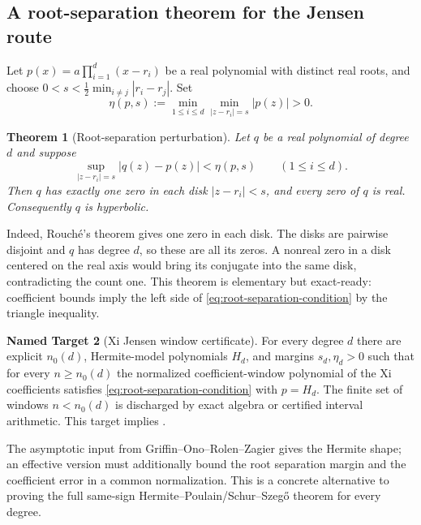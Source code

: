 \documentclass[11pt,a4paper]{article}
\newtheorem{theorem}{Theorem}[section]
\theoremstyle{definition}
\newtheorem{target}[theorem]{Named Target}
\newcommand{\Lean}[1]{\texttt{\small\seqsplit{#1}}}
\begin{document}
\subsection{A root-separation theorem for the Jensen route}

Let $p(x)=a\prod_{i=1}^d(x-r_i)$ be a real polynomial with distinct real
roots, and choose $0<s<\tfrac12\min_{i\ne j}|r_i-r_j|$.  Set
\begin{equation}
  \eta(p,s):=\min_{1\le i\le d}\min_{|z-r_i|=s}|p(z)|>0.
  \label{eq:rouche-margin}
\end{equation}

\begin{theorem}[Root-separation perturbation]
Let $q$ be a real polynomial of degree $d$ and suppose
\begin{equation}
  \sup_{|z-r_i|=s}|q(z)-p(z)|<\eta(p,s)
  \qquad(1\le i\le d).
  \label{eq:root-separation-condition}
\end{equation}
Then $q$ has exactly one zero in each disk $|z-r_i|<s$, and every zero of
$q$ is real.  Consequently $q$ is hyperbolic.
\end{theorem}

Indeed, Rouch\'e's theorem gives one zero in each disk.  The disks are
pairwise disjoint and $q$ has degree $d$, so these are all its zeros.  A
nonreal zero in a disk centered on the real axis would bring its conjugate
into the same disk, contradicting the count one.  This theorem is elementary
but exact-ready: coefficient bounds imply the left side of
\eqref{eq:root-separation-condition} by the triangle inequality.

\begin{target}[Xi Jensen window certificate]
For every degree $d$ there are explicit $n_0(d)$, Hermite-model polynomials
$H_d$, and margins $s_d,\eta_d>0$ such that for every $n\ge n_0(d)$ the
normalized coefficient-window polynomial of the Xi coefficients satisfies
\eqref{eq:root-separation-condition} with $p=H_d$.  The finite set of windows
$n<n_0(d)$ is discharged by exact algebra or certified interval arithmetic.
This target implies \Lean{XiJensenCoeffHyperbolic}.
\end{target}

The asymptotic input from Griffin--Ono--Rolen--Zagier \cite{GORZ2019} gives
the Hermite shape; an effective version must additionally bound the root
separation margin and the coefficient error in a common normalization.  This
is a concrete alternative to proving the full same-sign
Hermite--Poulain/Schur--Szeg\H{o} theorem for every degree.
\end{document}

